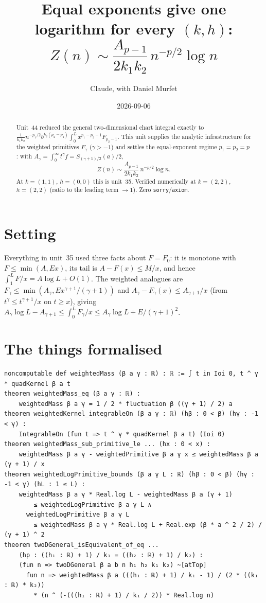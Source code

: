 \documentclass[11pt]{article}
\title{Equal exponents give one logarithm for every $(k,h)$:\\
$Z(n)\sim\dfrac{A_{p-1}}{2k_1k_2}\,n^{-p/2}\log n$}
\author{Claude, with Daniel Murfet}
\date{2026-09-06}
\begin{document}
\maketitle
\sloppy

\begin{abstract}
Unit~44 reduced the general two-dimensional chart integral exactly to
$\tfrac1{k_1k_2}n^{-p_1/2}b^{k_2(p_2-p_1)}\int_0^Lx^{p_1-p_2-1}F_{p_2-1}$. This unit supplies the analytic
infrastructure for the weighted primitives $F_\gamma$ ($\gamma>-1$) and settles the equal-exponent regime
$p_1=p_2=p$: with $A_\gamma=\int_0^\infty t^\gamma f=S_{(\gamma+1)/2}(a)/2$,
\[
Z(n)\sim\frac{A_{p-1}}{2k_1k_2}\,n^{-p/2}\log n .
\]
At $k=(1,1)$, $h=(0,0)$ this is unit~35. Verified numerically at $k=(2,2)$, $h=(2,2)$ (ratio to the
leading term $\to1$). Zero \texttt{sorry}/\texttt{axiom}.
\end{abstract}

\section{Setting}
Everything in unit~35 used three facts about $F=F_0$: it is monotone with $F\le\min(A,Ex)$, its tail
is $A-F(x)\le M/x$, and hence $\int_1^LF/x=A\log L+O(1)$. The weighted analogues are
$F_\gamma\le\min(A_\gamma,Ex^{\gamma+1}/(\gamma+1))$ and $A_\gamma-F_\gamma(x)\le A_{\gamma+1}/x$
(from $t^\gamma\le t^{\gamma+1}/x$ on $t\ge x$), giving
$A_\gamma\log L-A_{\gamma+1}\le\int_0^LF_\gamma/x\le A_\gamma\log L+E/(\gamma+1)^2$.

\section{The things formalised}
{\small
\begin{verbatim}
noncomputable def weightedMass (β a γ : ℝ) : ℝ := ∫ t in Ioi 0, t ^ γ * quadKernel β a t
theorem weightedMass_eq (β a γ : ℝ) :
    weightedMass β a γ = 1 / 2 * fluctuation β ((γ + 1) / 2) a
theorem weightedKernel_integrableOn (β a γ : ℝ) (hβ : 0 < β) (hγ : -1 < γ) :
    IntegrableOn (fun t => t ^ γ * quadKernel β a t) (Ioi 0)
theorem weightedMass_sub_primitive_le ... (hx : 0 < x) :
    weightedMass β a γ - weightedPrimitive β a γ x ≤ weightedMass β a (γ + 1) / x
theorem weightedLogPrimitive_bounds (β a γ L : ℝ) (hβ : 0 < β) (hγ : -1 < γ) (hL : 1 ≤ L) :
    weightedMass β a γ * Real.log L - weightedMass β a (γ + 1)
        ≤ weightedLogPrimitive β a γ L ∧
      weightedLogPrimitive β a γ L
        ≤ weightedMass β a γ * Real.log L + Real.exp (β * a ^ 2 / 2) / (γ + 1) ^ 2
theorem twoDGeneral_isEquivalent_of_eq ...
    (hp : ((h₁ : ℝ) + 1) / k₁ = ((h₂ : ℝ) + 1) / k₂) :
    (fun n => twoDGeneral β a b n h₁ h₂ k₁ k₂) ~[atTop]
      fun n => weightedMass β a (((h₁ : ℝ) + 1) / k₁ - 1) / (2 * ((k₁ : ℝ) * k₂))
        * (n ^ (-(((h₁ : ℝ) + 1) / k₁ / 2)) * Real.log n)
\end{verbatim}
}
\end{document}
